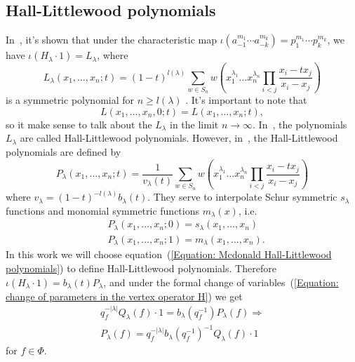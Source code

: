 \subsection{Hall-Littlewood polynomials}
In~\cite{jing1991vertex}, it's shown that under the characteristic map $\iota(a_{-1}^{m_1}\cdots a_{-k}^{m_k})=p_1^{m_1}\cdots p_k^{m_k}$, we have $\iota (H_\lambda\cdot1)=L_\lambda$, where 
\begin{equation}\label{Equation: Jing's Hall Littlewood polynomial}
    L_\lambda(x_1,\dots,x_n;t)=(1-t)^{l(\lambda)}\sum_{w\in S_n}w\left(x_1^{\lambda_1}\dots x_n^{\lambda_n}\prod_{i<j}\frac{x_i-tx_j}{x_i-x_j}\right)
\end{equation}
is a symmetric polynomial for $n\geq l(\lambda)$ . It's important to note that
\begin{equation}
    L(x_1,\dots,x_n,0;t)=L(x_1,\dots,x_n;t),
\end{equation}
so it make sense to talk about the $L_\lambda$ in the limit $n\to\infty$. In~\cite{jing1991vertex}, the polynomials $L_\lambda$ are called Hall-Littlewood polynomials. However, in~\cite{macdonald1998symmetric}, the Hall-Littlewood polynomials are defined by
\begin{equation}\label{Equation: Mcdonald Hall-Littlewood polynomials}
    P_\lambda(x_1,\dots,x_n;t)=\frac{1}{v_\lambda(t)}\sum_{w\in S_n}w\left(x_1^{\lambda_1}\dots x_n^{\lambda_n}\prod_{i<j}\frac{x_i-tx_j}{x_i-x_j}\right)
\end{equation}
where $v_\lambda=(1-t)^{-l(\lambda)}b_\lambda(t)$. They serve to interpolate Schur symmetric $s_\lambda$ functions and monomial symmetric functions $m_\lambda(x)$, i.e.
\begin{equation}
    \begin{split}
      &P_\lambda(x_1,\dots,x_n;0)=s_\lambda(x_1,\dots,x_n)\\
      &P_\lambda(x_1,\dots,x_n;1)=m_\lambda(x_1,\dots,x_n).
    \end{split}
\end{equation}
In this work we will choose equation~(\ref{Equation: Mcdonald Hall-Littlewood polynomials}) to define Hall-Littlewood polynomials. Therefore $\iota(H_\lambda\cdot1)=b_\lambda(t)P_\lambda$, and under the formal change of variables~(\ref{Equation: change of parameters in the vertex operator H}) we get 
\begin{equation}
\begin{split}
     q_f^{-|\lambda|}Q_\lambda(f)\cdot1=b_\lambda(q_f^{-1})P_\lambda(f)\Rightarrow\\
     P_\lambda(f) = q_f^{-|\lambda|}b_\lambda(q_f^{-1})^{-1}Q_\lambda(f)\cdot1
\end{split}
\end{equation}
for $f\in\Phi$.

